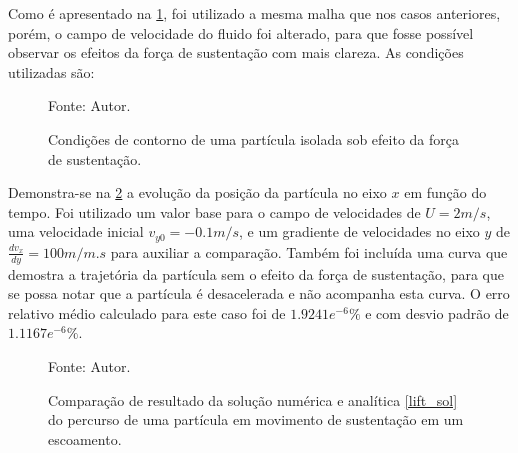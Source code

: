 Como é apresentado na \ref{lift_bc}, foi utilizado a mesma malha que nos casos anteriores, porém, o campo de velocidade do fluido foi alterado, para que fosse possível observar os efeitos da força de sustentação com mais clareza.
As condições utilizadas são:
\begin{figure}[H]
    \centering
     {\raggedleft \scriptsize Fonte: Autor.}
    \caption{Condições de contorno de uma partícula isolada sob efeito da força de sustentação.}
    \label{lift_bc}
\end{figure}

Demonstra-se na \ref{lift_comp} a evolução da posição da partícula no eixo $x$ em função do tempo.
Foi utilizado um valor base para o campo de velocidades de $U=2m/s$, uma velocidade inicial $v_{y0}=-0.1m/s$, e um gradiente de velocidades no eixo $y$ de $\tfrac{dv_x}{dy}=100m/m.s$ para auxiliar a comparação.
Também foi incluída uma curva que demostra a trajetória da partícula sem o efeito da força de sustentação, para que se possa notar que a partícula é desacelerada e não acompanha esta curva.
O erro relativo médio calculado para este caso foi de $1.9241e^{-6}\%$ e com desvio padrão de $1.1167e^{-6}\%$.
\begin{figure}[H]
    \centering
     {\raggedleft \scriptsize Fonte: Autor.}
    \caption{Comparação de resultado da solução numérica e analítica \ref{lift_sol} do percurso de uma partícula em movimento de sustentação em um escoamento.}
    \label{lift_comp}
\end{figure}

